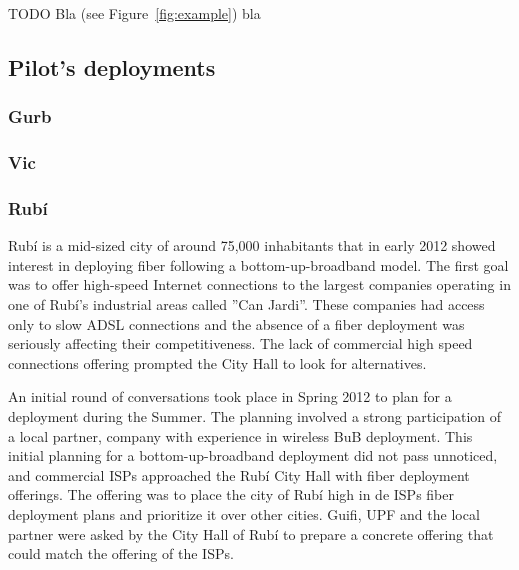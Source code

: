 TODO Bla (see Figure~\ref{fig:example}) bla


\subsection{Pilot's deployments}

\subsubsection{Gurb}



\subsubsection{Vic}

\subsubsection{Rub\'{i}}

Rub\'{i} is a mid-sized city of around 75,000 inhabitants that in early 2012 showed interest in deploying fiber following a bottom-up-broadband model.
The first goal was to offer high-speed Internet connections to the largest companies operating in one of Rub\'{i}'s industrial areas called ''Can Jardi''.
These companies had access only to slow ADSL connections and the absence of a fiber deployment was seriously affecting their competitiveness.
The lack of commercial high speed connections offering prompted the City Hall to look for alternatives.

An initial round of conversations took place in Spring 2012 to plan for a deployment during the Summer.
The planning involved a strong participation of a local partner, company with experience in wireless BuB deployment.
This initial planning for a bottom-up-broadband deployment did not pass unnoticed, and commercial ISPs approached the Rub\'{i} City Hall with fiber deployment offerings.
The offering was to place the city of Rub\'{i} high in de ISPs fiber deployment plans and prioritize it over other cities.
Guifi, UPF and the local partner were asked by the City Hall of Rub\'{i} to prepare a concrete offering that could match the offering of the ISPs.

